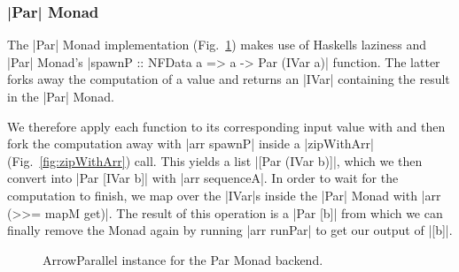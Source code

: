 \subsubsection{|Par| Monad}
The |Par| Monad implementation (Fig.~\ref{fig:ArrowParallelParMonad}) makes use of Haskells laziness and |Par| Monad's |spawnP :: NFData a => a -> Par (IVar a)| function. The latter forks away the computation of a value and returns an |IVar| containing the result in the |Par| Monad.


We therefore apply each function to its corresponding input value with and then fork the computation away with |arr spawnP| inside a |zipWithArr| (Fig.~\ref{fig:zipWithArr}) call. This yields a list |[Par (IVar b)]|, which we then convert into |Par [IVar b]| with |arr sequenceA|. In order to wait for the computation to finish, we map over the |IVar|s inside the |Par| Monad with |arr (>>= mapM get)|. The result of this operation is a |Par [b]| from which we can finally remove the Monad again by running |arr runPar| to get our output of |[b]|.
\begin{figure}[h]
\caption{ArrowParallel instance for the Par Monad backend.}
\label{fig:ArrowParallelParMonad}
\end{figure}

